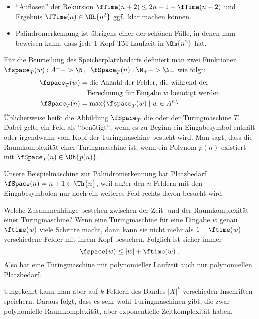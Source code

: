 \begin{tutorium}
  \begin{itemize}
  \item "`Auflösen"' der Rekursion $\fTime(n+2) \leq 2n+1 +
    \fTime(n-2)$ und Ergebnis $\fTime(n) \in \Oh{n^2}$ ggf.\ klar
    machen können.
  \item Palindromerkennung ist übrigens einer der schönen Fälle, in
    denen man beweisen kann, dass jede 1-Kopf-TM Laufzeit in
    $\Om{n^2}$ hat.
  \end{itemize}
\end{tutorium}


Für die Beurteilung des Speicherplatzbedarfs definiert man zwei
Funktionen $\fspace_T(w):A^+ -> \N_+$ $\fSpace_T(n):\N_+ -> \N_+$ wie
folgt:
\begin{align*}
  \fspace_T(w) &= \text{die Anzahl der Felder, die während der }\\
               &\quad  \text{Berechnung für Eingabe $w$ benötigt werden}\\
  \fSpace_T(n)   &= \max \{\fspace_T(w) \mid w\in A^n\} 
\end{align*}
Üblicherweise heißt die Abbildung $\fSpace_T$ die
 oder
 der Turingmaschine
$T$.  Dabei gelte ein Feld als "`benötigt"', wenn es zu Beginn ein
Eingabesymbol enthält oder irgendwann vom Kopf der Turingmaschine
besucht wird.  Man sagt, dass die Raumkomplexität einer Turingmaschine
ist, wenn ein Polynom $p(n)$ existiert mit
$\fSpace_T(n)\in\Oh{p(n)}$.

Unsere Beispielmaschine zur Palindromerkennung hat Platzbedarf
$\fSpace(n)=n+1\in\Th{n}$, weil außer den $n$ Feldern mit den
Eingabesymbolen nur noch ein weiteres Feld rechts davon besucht wird.

Welche Zusammenhänge bestehen zwischen der Zeit- und der
Raumkomplexität einer Turingmaschine? Wenn eine Turingmaschine für
eine Eingabe $w$ genau $\ftime(w)$ viele Schritte macht, dann kann sie
nicht mehr als $1+\ftime(w)$ verschiedene Felder mit ihrem Kopf
besuchen. Folglich ist sicher immer
\[
\fspace(w) \leq |w|+\ftime(w) \;.
\]
Also hat eine Turingmaschine mit polynomieller Laufzeit auch nur
polynomiellen Platzbedarf.

Umgekehrt kann man aber auf $k$ Feldern des Bandes $|X|^k$ verschieden
Inschriften speichern. Daraus folgt, dass es sehr wohl Turingmaschinen
gibt, die zwar polynomielle Raumkomplexität, aber exponentielle
Zeitkomplexität haben.

